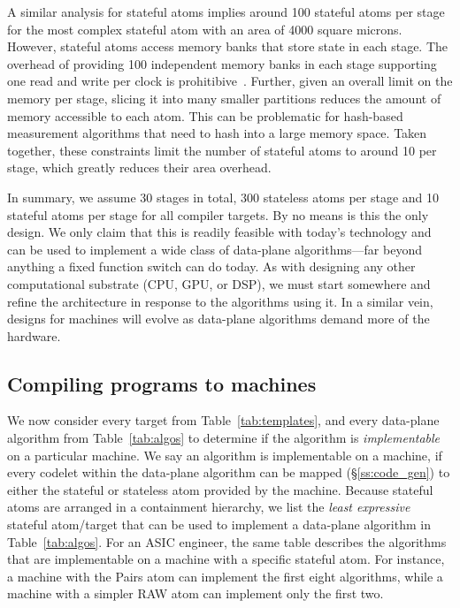 A similar analysis for stateful atoms implies around 100 stateful atoms per
stage for the most complex stateful atom with an area of 4000 square microns.
However, stateful atoms access memory banks that store state in each stage. The
overhead of providing 100 independent memory banks in each stage supporting one
read and write per clock is prohitibive~\cite{private_conversations_with_mike}.
Further, given an overall limit on the memory per stage, slicing it into many
smaller partitions reduces the amount of memory accessible to each atom. This
can be problematic for hash-based measurement algorithms that need to hash into
a large memory space. Taken together, these constraints limit the number of
stateful atoms to around 10 per stage, which greatly reduces their area
overhead.

In summary, we assume 30 stages in total, 300 stateless atoms per stage and 10
stateful atoms per stage for all compiler targets. By no means is this the only
design. We only claim that this is readily feasible with today's technology and
can be used to implement a wide class of data-plane algorithms---far beyond
anything a fixed function switch can do today. As with designing any other
computational substrate (CPU, GPU, or DSP), we must start somewhere and refine
the architecture in response to the algorithms using it. In a similar vein,
designs for \absmachine machines will evolve as data-plane algorithms demand
more of the hardware.


\subsection{Compiling \pktlanguage programs to \absmachine machines}

We now consider every target from Table~\ref{tab:templates}, and every
data-plane algorithm from Table~\ref{tab:algos} to determine if the algorithm
is \textit{implementable} on a particular \absmachine machine. We say an
algorithm is implementable on a \absmachine machine, if every codelet within
the data-plane algorithm can be mapped (\S\ref{ss:code_gen}) to either the
stateful or stateless atom provided by the \absmachine machine. Because
stateful atoms are arranged in a containment hierarchy, we list the
\textit{least expressive} stateful atom/target that can be used to implement a
data-plane algorithm in Table~\ref{tab:algos}. For an ASIC engineer, the same
table describes the algorithms that are implementable on a \absmachine machine
with a specific stateful atom. For instance, a \absmachine machine with the
Pairs atom can implement the first eight algorithms, while a machine with a
simpler RAW atom can implement only the first two.

